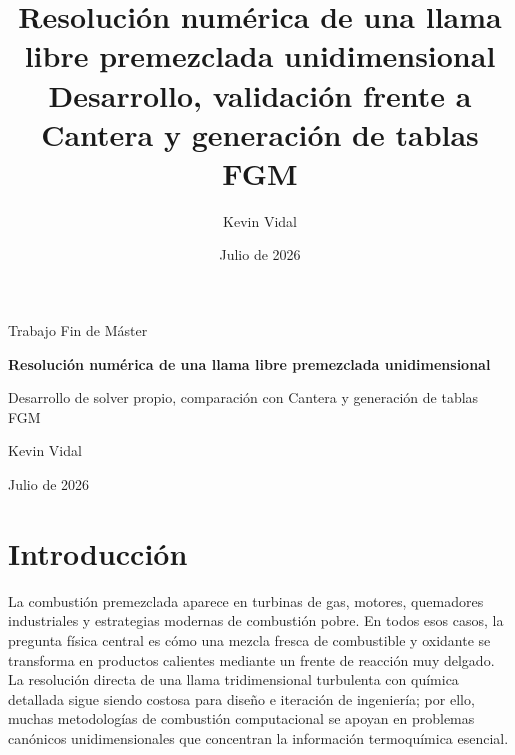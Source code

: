 \documentclass[12pt,a4paper]{article}
\title{\textbf{Resolución numérica de una llama libre premezclada unidimensional}\\
\large Desarrollo, validación frente a Cantera y generación de tablas FGM}
\author{Kevin Vidal}
\date{Julio de 2026}
\begin{document}

\begin{titlepage}
  \centering
  \vspace*{1.5cm}
  {\Large Trabajo Fin de Máster\par}
  \vspace{1.4cm}
  {\huge\bfseries Resolución numérica de una llama libre premezclada unidimensional\par}
  \vspace{0.6cm}
  {\Large Desarrollo de solver propio, comparación con Cantera y generación de tablas FGM\par}
  \vfill
  {\Large Kevin Vidal\par}
  \vspace{0.4cm}
  {\large Julio de 2026\par}
  \vfill
\end{titlepage}
\clearpage
{}

\tableofcontents
\clearpage
{}

\section{Introducción}

La combustión premezclada aparece en turbinas de gas, motores, quemadores industriales y estrategias modernas de combustión pobre. En todos esos casos, la pregunta física central es cómo una mezcla fresca de combustible y oxidante se transforma en productos calientes mediante un frente de reacción muy delgado. La resolución directa de una llama tridimensional turbulenta con química detallada sigue siendo costosa para diseño e iteración de ingeniería; por ello, muchas metodologías de combustión computacional se apoyan en problemas canónicos unidimensionales que concentran la información termoquímica esencial.
\end{document}
